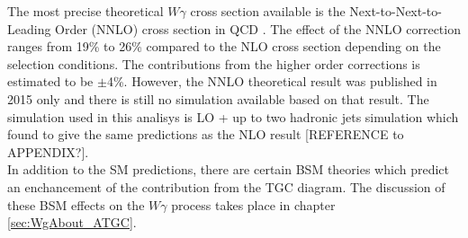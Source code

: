 The most precise theoretical $W\gamma$ cross section available is the Next-to-Next-to-Leading Order (NNLO) cross section in QCD \cite{ref_theory_NNLO}. The effect of the NNLO correction ranges from 19\% to 26\% compared to the NLO cross section depending on the selection conditions. The contributions from the higher order corrections is estimated to be $\pm$4\%. However, the NNLO theoretical result was published in 2015 only and there is still no simulation available based on that result. The simulation used in this analisys is LO + up to two hadronic jets simulation which found to give the same predictions as the NLO result [REFERENCE to APPENDIX?].\\

In addition to the SM predictions, there are certain BSM theories which predict an enchancement of the contribution from the TGC diagram. The discussion of these BSM effects on the $W\gamma$ process takes place in chapter \ref{sec:WgAbout_ATGC}.\\ 


